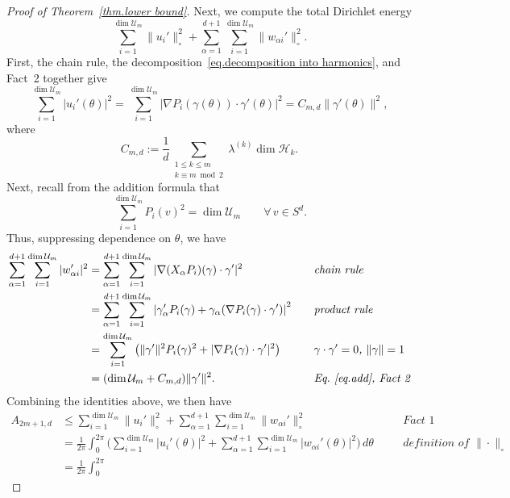 \documentclass[12pt]{article}
\theoremstyle{plain}
\theoremstyle{definition}
\theoremstyle{remark}
\begin{document}
\begin{proof}[Proof of Theorem~\ref{thm.lower bound}]
Next, we compute the total Dirichlet energy
\[
\sum_{i=1}^{\operatorname{dim}\mathcal{U}_m}\|u_i'\|_\circ^2
+
\sum_{\alpha=1}^{d+1}\sum_{i=1}^{\operatorname{dim}\mathcal{U}_m}\|w_{\alpha i}'\|_\circ^2.
\]
First, the chain rule, the decomposition~\eqref{eq.decomposition into harmonics}, and Fact~2 together give
\[
\sum_{i=1}^{\operatorname{dim}\mathcal{U}_m} |u_i'(\theta)|^2
=
\sum_{i=1}^{\operatorname{dim}\mathcal{U}_m} |\nabla P_i(\gamma(\theta))\cdot \gamma'(\theta)|^2
=
C_{m,d}\|\gamma'(\theta)\|^2,
\]
where
\[
C_{m,d}
:=
\frac{1}{d}
\sum_{\substack{1\leq k\leq m\\ k\equiv m\bmod 2}}
\lambda^{(k)}\operatorname{dim}\mathcal H_k.
\]
Next, recall from the addition formula that
\begin{equation}
\label{eq.add}
\sum_{i=1}^{\operatorname{dim}\mathcal{U}_m} P_i(v)^2={\operatorname{dim}\mathcal{U}_m}
\qquad
\forall\,v\in S^d.
\end{equation}
Thus, suppressing dependence on $\theta$, we have
\[
\begin{aligned}
\sum_{\alpha=1}^{d+1}\sum_{i=1}^{\operatorname{dim}\mathcal{U}_m} |w_{\alpha i}'|^2
&=
\sum_{\alpha=1}^{d+1}\sum_{i=1}^{\operatorname{dim}\mathcal{U}_m}
|\nabla(X_\alpha P_i)(\gamma)\cdot \gamma'|^2
&&\textit{chain rule}\\
&=
\sum_{\alpha=1}^{d+1}\sum_{i=1}^{\operatorname{dim}\mathcal{U}_m}
\left|
\gamma'_\alpha P_i(\gamma)
+
\gamma_\alpha(\nabla P_i(\gamma)\cdot \gamma')
\right|^2\quad
&&\textit{product rule}\\
&=
\sum_{i=1}^{\operatorname{dim}\mathcal{U}_m}
\big(
\|\gamma'\|^2P_i(\gamma)^2
+
|\nabla P_i(\gamma)\cdot \gamma'|^2
\big)
&&\textit{\(\gamma\cdot\gamma'=0\), \(\|\gamma\|=1\)}\\
&=
(\operatorname{dim}\mathcal{U}_m+C_{m,d})\|\gamma'\|^2.
&&\textit{Eq.\ \eqref{eq.add}, Fact~2}
\end{aligned}
\]
Combining the identities above, we then have
\[
\begin{aligned}
A_{2m+1,d}
&\leq
\sum_{i=1}^{\operatorname{dim}\mathcal{U}_m}\|u_i'\|_\circ^2
+
\sum_{\alpha=1}^{d+1}\sum_{i=1}^{\operatorname{dim}\mathcal{U}_m}\|w_{\alpha i}'\|_\circ^2
&&\textit{Fact~1}\\
&=
\frac{1}{2\pi}\int_0^{2\pi}
\bigg(
\sum_{i=1}^{\operatorname{dim}\mathcal{U}_m} |u_i'(\theta)|^2
+
\sum_{\alpha=1}^{d+1}\sum_{i=1}^{\operatorname{dim}\mathcal{U}_m} |w_{\alpha i}'(\theta)|^2
\bigg)\,d\theta\quad
&&\textit{definition of \(\|\cdot\|_\circ\)}\\
&=
\frac{1}{2\pi}\int_0^{2\pi}

\end{aligned}\]
\end{proof}
\end{document}
